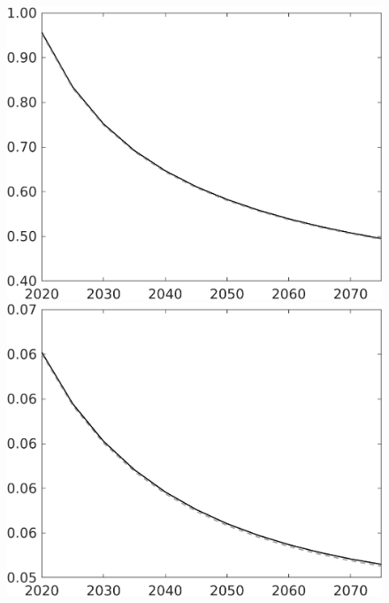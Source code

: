 \documentclass[12pt]{article}
\begin{document}
\begin{figure}[h!!]
\begin{minipage}[]{0.32\textwidth}
	\end{minipage}	
	\begin{minipage}[]{0.32\textwidth}
		\includegraphics[width=1\textwidth]{../../codding_model/own_basedOnFried/optimalPol_010922_revision/figures/all_13Sept22/CompTaul_Equlab_LFBAU_Reg0_pg_spillover0_nsk0_xgr0_knspil0_sep1_countec0_GovRev0_etaa0.79_lgd0.png}
	\end{minipage}		
	\begin{minipage}[]{0.32\textwidth}
		\includegraphics[width=1\textwidth]{../../codding_model/own_basedOnFried/optimalPol_010922_revision/figures/all_13Sept22/CompTaul_Equlab_LFBAU_Reg0_pepn_spillover0_nsk0_xgr0_knspil0_sep1_countec0_GovRev0_etaa0.79_lgd0.png}

\end{minipage}
\end{figure}
\end{document}
